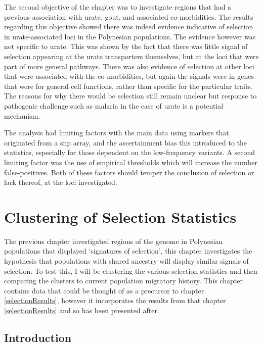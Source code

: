 \documentclass[twoside,openright]{report}
\begin{document}
The second objective of the chapter was to investigate regions that had
a previous association with urate, gout, and associated co-morbidities.
The results regarding this objective showed there was indeed evidence
indicative of selection in urate-associated loci in the Polynesian
populations. The evidence however was not specific to urate. This was
shown by the fact that there was little signal of selection appearing at
the urate transporters themselves, but at the loci that were part of
more general pathways. There was also evidence of selection at other
loci that were associated with the co-morbidities, but again the signals
were in genes that were for general cell functions, rather than specific
for the particular traits. The reasons for why there would be selection
still remain unclear but response to pathogenic challenge such as
malaria in the case of urate is a potential mechanism.

The analysis had limiting factors with the main data using markers that
originated from a \gls{snp} array, and the ascertainment bias this
introduced to the statistics, especially for those dependent on the
low-frequency variants. A second limiting factor was the use of
empirical thresholds which will increase the number false-positives.
Both of these factors should temper the conclusion of selection or lack
thereof, at the loci investigated.

\chapter{Clustering of Selection Statistics}\label{clustering}

\glsresetall

The previous chapter investigated regions of the genome in Polynesian
populations that displayed `signatures of selection', this chapter
investigates the hypothesis that populations with shared ancestry will
display similar signals of selection. To test this, I will be clustering
the various selection statistics and then comparing the clusters to
current population migratory history. This chapter contains data that
could be thought of as a precursor to chapter \ref{selectionResults},
however it incorporates the results from that chapter
\ref{selectionResults} and so has been presented after.

\section{Introduction}\label{chap4Intro}
\end{document}
